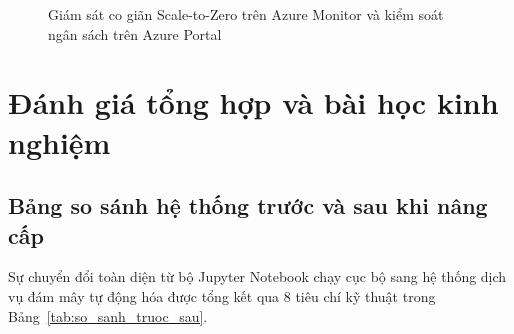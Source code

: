 \begin{figure}[H]
\centering
{}
\caption{Giám sát co giãn Scale-to-Zero trên Azure Monitor và kiểm soát ngân sách trên Azure Portal}
\label{fig:azure_monitor_cost}
\end{figure}

\section{Đánh giá tổng hợp và bài học kinh nghiệm}
\label{sec:danh_gia_tong_hop}

\subsection{Bảng so sánh hệ thống trước và sau khi nâng cấp}
\label{subsec:so_sanh_he_thong}

Sự chuyển đổi toàn diện từ bộ Jupyter Notebook chạy cục bộ sang hệ thống dịch vụ đám mây tự động hóa được tổng kết qua 8 tiêu chí kỹ thuật trong Bảng~\ref{tab:so_sanh_truoc_sau}.

